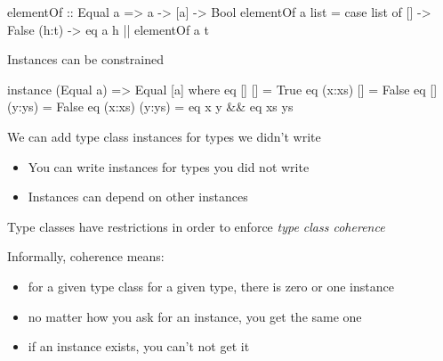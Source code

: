 \documentclass[usenames,dvipsnames,svgnames,table,aspectratio=169,mathserif]{beamer}
\newcommand{\nl}{\vspace{\baselineskip}}
\newcommand{\pnl}{\pause \nl}
\begin{document}
\begin{frame}[fragile]
\begin{haskellcode}
elementOf :: Equal a => a -> [a] -> Bool
elementOf a list =
  case list of
    []    -> False
    (h:t) -> eq a h || elementOf a t
\end{haskellcode}
\end{frame}


\begin{frame}[fragile]
Instances can be constrained

\nl

\begin{haskellcode}
instance (Equal a) => Equal [a] where
  eq []     []     = True
  eq (x:xs) []     = False
  eq []     (y:ys) = False
  eq (x:xs) (y:ys) = eq x y && eq xs ys
\end{haskellcode}

\pnl

We can add type class instances for types we didn't write
\end{frame}


\begin{frame}

\begin{itemize}
\item You can write instances for types you did not write
\item Instances can depend on other instances
\end{itemize}

\end{frame}


\begin{frame}
Type classes have restrictions in order to enforce {\it type class coherence}

\nl

Informally, coherence means:
\begin{itemize}
\item for a given type class for a given type, there is zero or one instance 
\item no matter how you ask for an instance, you get the same one
\item if an instance exists, you can't not get it
\end{itemize}
\end{frame}
\end{document}
